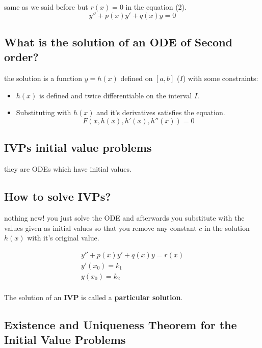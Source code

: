 \documentclass[11pt]{article}
\theoremstyle{definition}
\begin{document}
same as we said before but $r(x)=0$ in the equation (2).
\begin{equation}
\label{H}
    y''+p(x)y'+q(x)y=0
\end{equation}

\subsection{What  is the solution of an ODE of Second order?}
the solution is a function $y=h(x)$ defined on $[a,b]$ ($I$) with some constraints: 
\begin{itemize}
    \item $h(x)$ is defined and twice differentiable on the interval $I$.
    \item Substituting with $h(x)$ and it's derivatives satisfies the equation.
    \begin{equation}
        F(x, h(x), h'(x), h''(x)) = 0
    \end{equation}
    
\end{itemize}

\subsection{IVPs initial value problems}

they are ODEs which have initial values.


\subsection{How to solve IVPs?}
nothing new! you just solve the ODE and afterwards you substitute with the values given as initial values so that you remove any constant $c$ in the solution $h(x)$ with it's original value. 
\begin{shaded}
\begin{equation} 
\begin{split} 
  y''+p(x)y'+q(x)y=r(x) \\
  y'(x_0) = k_1 \\
  y(x_0) = k_2\\
  \end{split} 
\end{equation}
\end{shaded}

The solution of an \textbf{IVP} is called a \textbf{particular solution}.
\subsection{Existence and Uniqueness Theorem for the Initial Value Problems}
\end{document}
